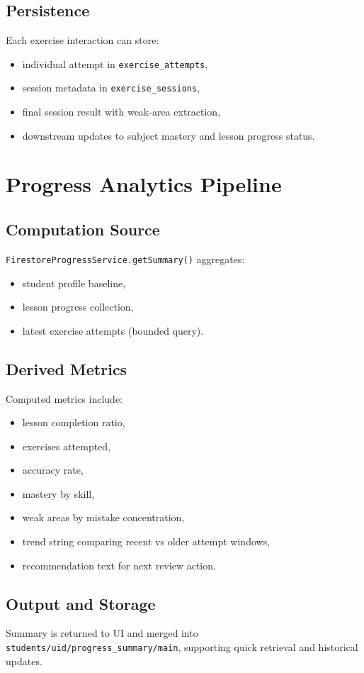 \documentclass[11pt,a4paper]{article}
\begin{document}
\subsection{Persistence}
Each exercise interaction can store:
\begin{itemize}
  \item individual attempt in \texttt{exercise\_attempts},
  \item session metadata in \texttt{exercise\_sessions},
  \item final session result with weak-area extraction,
  \item downstream updates to subject mastery and lesson progress status.
\end{itemize}

\section{Progress Analytics Pipeline}
\subsection{Computation Source}
\texttt{FirestoreProgressService.getSummary()} aggregates:
\begin{itemize}
  \item student profile baseline,
  \item lesson progress collection,
  \item latest exercise attempts (bounded query).
\end{itemize}

\subsection{Derived Metrics}
Computed metrics include:
\begin{itemize}
  \item lesson completion ratio,
  \item exercises attempted,
  \item accuracy rate,
  \item mastery by skill,
  \item weak areas by mistake concentration,
  \item trend string comparing recent vs older attempt windows,
  \item recommendation text for next review action.
\end{itemize}

\subsection{Output and Storage}
Summary is returned to UI and merged into \texttt{students/{uid}/progress\_summary/main}, supporting quick retrieval and historical updates.
\end{document}
